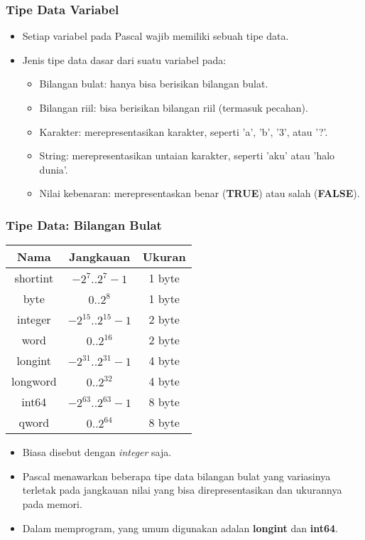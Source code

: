 \documentclass{beamer}
\begin{document}
\begin{frame}
\frametitle{Tipe Data Variabel}
\begin{itemize}
	\item Setiap variabel pada Pascal wajib memiliki sebuah \alert{tipe data}.
	\item Jenis tipe data dasar dari suatu variabel pada:
	\begin{itemize}
		\item Bilangan bulat: hanya bisa berisikan bilangan bulat.
		\item Bilangan riil: bisa berisikan bilangan riil (termasuk pecahan).
		\item Karakter: merepresentasikan karakter, seperti 'a', 'b', '3', atau '?'.
		\item String: merepresentasikan untaian karakter, seperti 'aku' atau 'halo dunia'.
		\item Nilai kebenaran: merepresentaskan benar (\textbf{TRUE}) atau salah (\textbf{FALSE}).
	\end{itemize}
\end{itemize}
\end{frame}

\begin{frame}
\frametitle{Tipe Data: Bilangan Bulat}
\begin{tabular}{|c|c|c|}
	\hline Nama  & Jangkauan  & Ukuran \\ 
	\hline shortint & $-2^7 .. 2^7-1$ & 1 byte \\ 
	\hline byte & $0 .. 2^8$ & 1 byte\\ 
	\hline integer & $-2^{15} .. 2^{15}-1$ & 2 byte\\ 
	\hline word & $0 .. 2^{16}$ & 2 byte\\ 
	\hline longint & $-2^{31} .. 2^{31}-1$ & 4 byte\\ 
	\hline longword & $0 .. 2^{32}$ & 4 byte\\ 
	\hline int64 & $-2^{63} .. 2^{63}-1$ & 8 byte\\ 
	\hline qword & $0 .. 2^{64}$ & 8 byte\\ 
	\hline 
\end{tabular} 
\begin{itemize}
	\item Biasa disebut dengan \alert{\textit{integer}} saja.
	\item Pascal menawarkan beberapa tipe data bilangan bulat yang variasinya terletak pada jangkauan nilai yang bisa direpresentasikan dan ukurannya pada memori.
	\item Dalam memprogram, yang umum digunakan adalan \alert{\textbf{longint}} dan \alert{\textbf{int64}}. 
\end{itemize}
\end{frame}
\end{document}
